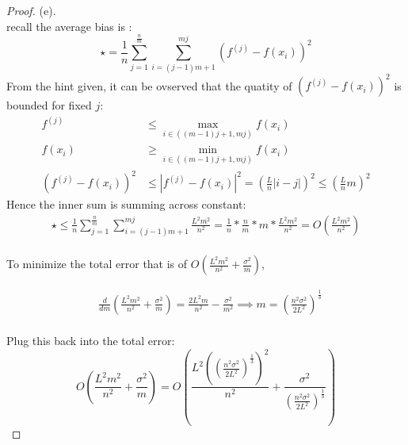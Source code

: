 \documentclass[12pt]{article}
\begin{document}
\begin{proof}
        (e).\\
        recall the average bias is :
        $$\star = \frac{1}{n} \sum_{j=1}^{\frac{n}{m}}\sum_{i = (j-1)m+1}^{mj}(f^{(j)} - f(x_i))^2$$
        From the hint given, it can be ovserved that the quatity of $(f^{(j)} - f(x_i))^2$ is bounded for fixed $j$: 
        \[
        \begin{aligned}
                f^{(j)} & \leq  \max_{i \in ((m-1)j+1,mj) } f(x_i)\\
                f(x_i) & \geq   \min_{i \in ((m-1)j+1,mj) } f(x_i)\\
        (f^{(j)} -f(x_i) )^2 &\leq    |f^{(j)} -f(x_i) |^2  = (\frac{L}{n}|i-j|)^2  \leq  (\frac{L}{n}m)^2 
\end{aligned}
\]
Hence the inner sum is summing across constant: \\
\[
\begin{aligned}
        \star  \leq  \frac{1}{n} \sum_{j=1}^{\frac{n}{m}}\sum_{i = (j-1)m+1}^{mj} \frac{L^2 m^2}{n^2} = \frac{1}{n}*\frac{n}{m}*m *\frac{L^2 m^2}{n^2} = O(\frac{L^2m^2}{n^2})
\end{aligned}
\]\\

To minimize the total error that is of $O(\frac{L^2m^2}{n^2} + \frac{\sigma^2}{m})$, 

\[
\begin{aligned}
        & \frac{d}{dm}(\frac{L^2m^2}{n^2} + \frac{\sigma^2}{m})  = \frac{2L^2m}{n^2} - \frac{\sigma^2}{m^2} \implies m = (\frac{n^2\sigma^2}{2L^2})^{\frac{1}{3}}
\end{aligned}
\]\\
Plug this back into the total error: 
$$O(\frac{L^2m^2}{n^2} + \frac{\sigma^2}{m})=O(\frac{L^2((\frac{n^2\sigma^2}{2L^2})^{\frac{1}{3}}
)^2}{n^2} + \frac{\sigma^2}{(\frac{n^2\sigma^2}{2L^2})^{\frac{1}{3}} 
})$$
\end{proof}

\newpage
\end{document}
